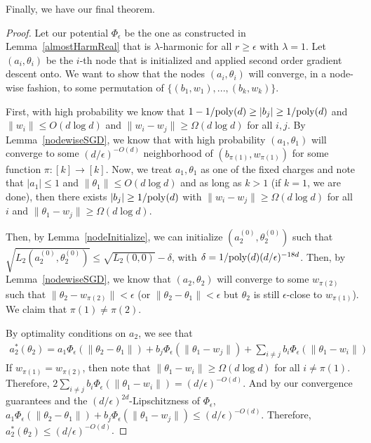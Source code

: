 Finally, we have our final theorem.

\nodewise*

\begin{proof}
Let our potential $\Phi_{\epsilon}$ be the one as constructed in Lemma~\ref{almostHarmReal} that is $\lambda$-harmonic for all $r \geq \epsilon$ with $\lambda = 1$. Let $(a_i, \theta_i)$ be the $i$-th node that is initialized and applied second order gradient descent onto. We want to show that the nodes $(a_i, \theta_i)$ will converge, in a node-wise fashion, to some permutation of $\{(b_1,w_1),...,(b_k,w_k)\}$. 

First, with high probability we know that $1 - 1/\mathrm{poly}(d) \geq |b_j| \geq 1/\mathrm{poly}(d)$ and $\|w_i\|\leq O(d\log d)$ and $\|w_i - w_j \| \geq \Omega(d\log d)$ for all $i, j$. By Lemma~\ref{nodewiseSGD}, we know that with high probability $(a_1,\theta_1)$ will converge to some $(d/\epsilon)^{-O(d)}$ neighborhood of $(b_{\pi(1)}, w_{\pi(1)})$ for some function $\pi: [k] \to [k]$. Now, we treat $a_1, \theta_1$ as one of the fixed charges and note that $|a_1| \leq 1$ and $\|\theta_1\| \leq O(d\log d)$ and as long as $k > 1$ (if $k = 1$, we are done), then there exists $|b_j| \geq 1/\mathrm{poly}(d)$ with $\|w_i - w_j\| \geq \Omega(d\log d)$ for all $i$ and $\|\theta_1 - w_j \| \geq \Omega(d\log d)$.

Then, by Lemma~\ref{nodeInitialize}, we can initialize $(a_2^{(0)}, \theta_2^{(0)})$ such that $\sqrt{L_2(a_2^{(0)}, \theta_2^{(0)})} \leq \sqrt{L_2(0,0)} - \delta$, with $\delta = 1/\mathrm{poly}(d) (d/\epsilon)^{-18d}$. Then, by Lemma~\ref{nodewiseSGD}, we know that $(a_2, \theta_2)$ will converge to some $w_{\pi(2)}$ such that $\|\theta_2 - w_{\pi(2)}\| <\epsilon$ (or $\|\theta_2 - \theta_1 \| < \epsilon$ but $\theta_2$ is still $\epsilon$-close to $w_{\pi(1)}$). We claim that $\pi(1) \neq \pi(2)$.

By optimality conditions on $a_2$, we see that 
\begin{align*}
a_2^*(\theta_2) = a_1 \Phi_{\epsilon}(\|\theta_2 - \theta_1\|) + b_j \Phi_{\epsilon}(\|\theta_1 - w_j\|) +  \sum_{i \neq j} b_i \Phi_{\epsilon}(\|\theta_1 - w_i\|)
\end{align*}
If $w_{\pi(1)} = w_{\pi(2)}$, then note that $\|\theta_1 - w_i \| \geq \Omega(d\log d)$ for all $i \neq \pi(1)$. Therefore, $2 \sum_{i \neq j} b_i \Phi_{\epsilon}(\|\theta_1 - w_i\|) = (d/\epsilon)^{-O(d)}$. And by our convergence guarantees and the $(d/\epsilon)^{2d}$-Lipschitzness of $\Phi_{\epsilon}$, $ a_1 \Phi_{\epsilon}(\|\theta_2 - \theta_1\|) + b_j \Phi_{\epsilon}(\|\theta_1 - w_j\|) \leq (d/\epsilon)^{-O(d)}$. Therefore, $a_2^*(\theta_2) \leq (d/\epsilon)^{-O(d)}$. 


\end{proof}
